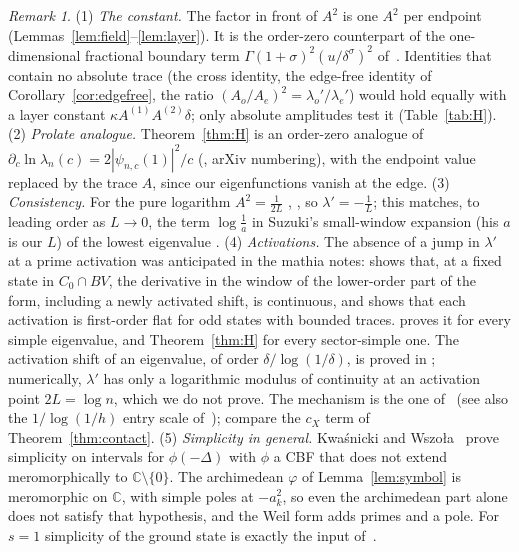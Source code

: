 \documentclass[11pt]{amsart}
\newcommand{\C}{\mathbb{C}}
\theoremstyle{definition}
\theoremstyle{remark}
\newtheorem{remark}[theorem]{Remark}
\numberwithin{equation}{section}
\begin{document}
\begin{remark}\label{rem:H}
(1) \emph{The constant.} The factor in front of $A^2$ is one $A^2$ per endpoint (Lemmas~\ref{lem:field}--\ref{lem:layer}). It is the order-zero counterpart of the one-dimensional fractional boundary term $\Gamma(1+\sigma)^2(u/\delta^\sigma)^2$ of~\cite{DFW21}. Identities that contain no absolute trace (the cross identity, the edge-free identity of Corollary~\ref{cor:edgefree}, the ratio $(A_o/A_e)^2=\lambda_o'/\lambda_e'$) would hold equally with a layer constant $\kappa A^{(1)}A^{(2)}\delta$; only absolute amplitudes test it (Table~\ref{tab:H}). (2) \emph{Prolate analogue.} Theorem~\ref{thm:H} is an order-zero analogue of $\partial_c\ln\lambda_n(c)=2|\psi_{n,c}(1)|^2/c$ (\cite[eq.~(43)]{BK17}, arXiv numbering), with the endpoint value replaced by the trace $A$, since our eigenfunctions vanish at the edge. (3) \emph{Consistency.} For the pure logarithm $A^2=\frac1{2L}$ \cite[Cor.~2.3]{BT26}, \cite{BPL}, so $\lambda'=-\frac1L$; this matches, to leading order as $L\to0$, the term $\log\frac1a$ in Suzuki's small-window expansion (his $a$ is our $L$) of the lowest eigenvalue \cite[Thm.~1.4]{Suz26}. (4) \emph{Activations.} The absence of a jump in $\lambda'$ at a prime activation was anticipated in the mathia notes: \cite{PL305} shows that, at a fixed state in $C_0\cap BV$, the derivative in the window of the lower-order part of the form, including a newly activated shift, is continuous, and \cite{PL338} shows that each activation is first-order flat for odd states with bounded traces. \cite[Thm.~2.2]{BT26} proves it for every simple eigenvalue, and Theorem~\ref{thm:H} for every sector-simple one. The activation shift of an eigenvalue, of order $\delta/\log(1/\delta)$, is proved in \cite[Thm.~2.4]{BT26}; numerically, $\lambda'$ has only a logarithmic modulus of continuity at an activation point $2L=\log n$, which we do not prove. The mechanism is the one of~\cite{PL338} (see also the $1/\log(1/h)$ entry scale of~\cite{Tuma}); compare the $c_X$ term of Theorem~\ref{thm:contact}. (5) \emph{Simplicity in general.} Kwa\'snicki and Wszo{\l}a~\cite[Thm.~1.2]{KW26} prove simplicity on intervals for $\phi(-\Delta)$ with $\phi$ a CBF that does not extend meromorphically to $\C\setminus\{0\}$. The archimedean $\varphi$ of Lemma~\ref{lem:symbol} is meromorphic on $\C$, with simple poles at $-a_k^2$, so even the archimedean part alone does not satisfy that hypothesis, and the Weil form adds primes and a pole. For $s=1$ simplicity of the ground state is exactly the input of~\cite{GS}.
\end{remark}
\end{document}
